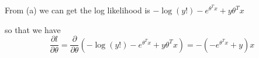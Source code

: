 \begin{answer}
From (a) we can get the log likelihood is
$  -\log(y!)-e^{\theta^Tx}+y\theta^Tx  $

so that we have
\[ \frac{\partial l}{\partial \theta}= \frac{\partial}{\partial \theta}\left(-\log(y!)-e^{\theta^Tx}+y\theta^Tx  \right) =- (-e^{\theta^Tx}+y)x\]


\end{answer}
